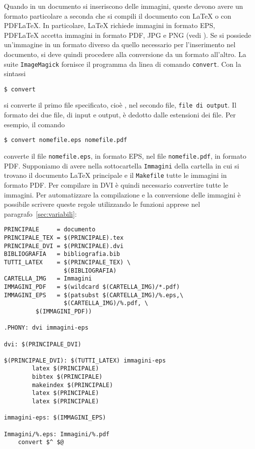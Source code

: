Quando in un documento si inseriscono delle immagini, queste devono avere un
formato particolare a seconda che si compili il documento con \LaTeX{}
o con \textsc{PDF}\LaTeX.  In particolare, \LaTeX{}
richiede immagini in formato \textsc{EPS}, \textsc{PDF}\LaTeX{}
accetta immagini in formato \textsc{PDF}, \textsc{JPG} e \textsc{PNG} (vedi
\cite[pagina 105]{pantieri:latex}).  Se si possiede un'immagine in un formato
diverso da quello necessario per l'inserimento nel documento, si deve quindi
procedere alla conversione da un formato all'altro.  La suite
\texttt{ImageMagick} fornisce il programma da linea di comando
\texttt{convert}. Con la sintassi
\begin{sintassi}
  \texttt{\$ convert}  
\end{sintassi}
si converte il primo file specificato, cioè , nel secondo
file, \texttt{file di output}.  Il formato dei due file, di input e output, è
dedotto dalle estensioni dei file.  Per esempio, il comando
\begin{verbatim}
$ convert nomefile.eps nomefile.pdf
\end{verbatim}
converte il file \texttt{nomefile.eps}, in formato \textsc{EPS}, nel file
\texttt{nomefile.pdf}, in formato \textsc{PDF}.  Supponiamo di avere nella
sottocartella \texttt{Immagini} della cartella in cui si trovano il documento
\LaTeX{}
principale e il \texttt{Makefile} tutte le immagini in formato \textsc{PDF}.
Per compilare in \textsc{DVI} è quindi necessario convertire tutte le immagini.
Per automatizzare la compilazione e la conversione delle immagini è possibile
scrivere queste regole utilizzando le funzioni apprese nel
paragrafo~\ref{sec:variabili}:
\begin{lstlisting}[caption={\texttt{Makefile} in cui le immagini \textsc{PDF}
vengono convertite in \textsc{EPS} nella compilazione con \LaTeX.},label=lst:pdf-eps]
PRINCIPALE     = documento
PRINCIPALE_TEX = $(PRINCIPALE).tex
PRINCIPALE_DVI = $(PRINCIPALE).dvi
BIBLIOGRAFIA   = bibliografia.bib
TUTTI_LATEX    = $(PRINCIPALE_TEX) \
                 $(BIBLIOGRAFIA)
CARTELLA_IMG   = Immagini
IMMAGINI_PDF   = $(wildcard $(CARTELLA_IMG)/*.pdf)
IMMAGINI_EPS   = $(patsubst $(CARTELLA_IMG)/%.eps,\
                 $(CARTELLA_IMG)/%.pdf, \
		 $(IMMAGINI_PDF))

.PHONY: dvi immagini-eps

dvi: $(PRINCIPALE_DVI)

$(PRINCIPALE_DVI): $(TUTTI_LATEX) immagini-eps
        latex $(PRINCIPALE)
        bibtex $(PRINCIPALE)
        makeindex $(PRINCIPALE)
        latex $(PRINCIPALE)
        latex $(PRINCIPALE)

immagini-eps: $(IMMAGINI_EPS)

Immagini/%.eps: Immagini/%.pdf
	convert $^ $@
\end{lstlisting} %
